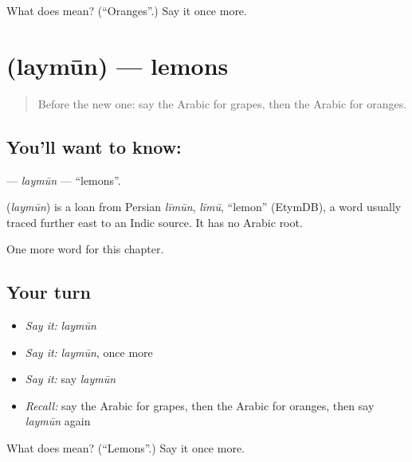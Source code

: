 \begin{tcolorbox}[breakable,colback=teal!4,colframe=teal!35!black,title={Before you move on}]
What does  mean? (\textquotedblleft{}Oranges\textquotedblright{}.) Say it once more.
\end{tcolorbox}
\section[\texorpdfstring{\ar{ليمون} (laymūn)}{ليمون (laymūn)}]{ (laymūn) — lemons}

\label{lesson:AR-C68-laymun}



\begin{quote}
Before the new one: say the Arabic for grapes, then the Arabic for oranges.
\end{quote}

\subsection*{You'll want to know: }
\textbf{} — \emph{laymūn} — \textquotedblleft{}lemons\textquotedblright{}.

\begin{cousinweb}
\textbf{} (\emph{laymūn}) is a loan from Persian \emph{līmūn}, \emph{līmū}, \textquotedblleft{}lemon\textquotedblright{} (EtymDB), a word usually traced further east to an Indic source. It has no Arabic root.
\end{cousinweb}

\begin{grammarlens}[title={What you've built}]
One more word for this chapter.
\end{grammarlens}

\subsection*{Your turn}
\begin{itemize}
\raggedright
  \item \emph{Say it:} \emph{laymūn}
  \item \emph{Say it:} \emph{laymūn}, once more
  \item \emph{Say it:} say \emph{laymūn}
  \item \emph{Recall:} say the Arabic for grapes, then the Arabic for oranges, then say \emph{laymūn} again
\end{itemize}

\begin{tcolorbox}[breakable,colback=teal!4,colframe=teal!35!black,title={Before you move on}]
What does  mean? (\textquotedblleft{}Lemons\textquotedblright{}.) Say it once more.
\end{tcolorbox}
